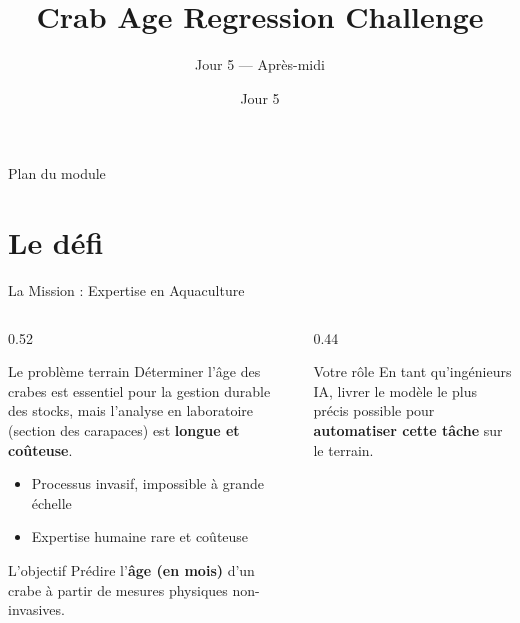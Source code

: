 \documentclass[aspectratio=169, 10pt]{beamer}
\title[Challenge Kaggle]{Crab Age Regression Challenge}
\subtitle{Jour 5 --- Après-midi}
\date{Jour 5}
\begin{document}

\begin{frame}
  \titlepage
\end{frame}

\begin{frame}{Plan du module}
  \tableofcontents
\end{frame}

\section{Le défi}

\begin{frame}{La Mission : Expertise en Aquaculture}
  \begin{columns}[T]
    \begin{column}{0.52\textwidth}
      \begin{alertblock}{Le problème terrain}
        Déterminer l'âge des crabes est essentiel pour la gestion
        durable des stocks, mais l'analyse en laboratoire
        (section des carapaces) est \textbf{longue et coûteuse}.
        \begin{itemize}
          \item Processus invasif, impossible à grande échelle
          \item Expertise humaine rare et coûteuse
        \end{itemize}
      \end{alertblock}
      \smallskip
      \begin{block}{L'objectif}
        Prédire l'\textbf{âge (en mois)} d'un crabe à partir de
        mesures physiques non-invasives.
      \end{block}
    \end{column}
    \begin{column}{0.44\textwidth}
      \begin{exampleblock}{Votre rôle}
        En tant qu'ingénieurs IA, livrer le modèle le plus précis
        possible pour \textbf{automatiser cette tâche} sur le terrain.
        \vspace{4pt}
        \begin{center}
        \end{center}
      \end{exampleblock}
    \end{column}
  \end{columns}
\end{frame}
\end{document}
